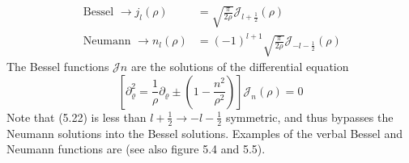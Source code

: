 \begin{align}
\text { Bessel } \rightarrow j_{l}(\rho)&=\sqrt{\frac{\pi}{2 \rho}} \mathcal{J}_{l+\frac{1}{2}}(\rho) \\
 \text { Neumann } \rightarrow n_{l}(\rho)&=(-1)^{l+1} \sqrt{\frac{\pi}{2 \rho}} \mathcal{J}_{-l-\frac{1}{2}}(\rho)
\end{align}
The Bessel functions $\mathcal{J}n$ are the solutions of the differential equation
\begin{equation}
    \left[\partial_{\varrho}^{2}=\frac{1}{\rho} \partial_{\varrho} \pm\left(1-\frac{n^{2}}{\rho^{2}}\right)\right] \mathcal{J}_{n}(\rho)=0
    \end{equation}
Note that (5.22) is less than $l+\frac{1}{2}\rightarrow -l-\frac{1}{2}$ symmetric, and thus bypasses the Neumann solutions into the Bessel solutions. Examples of the verbal Bessel and Neumann functions are (see also figure 5.4 and 5.5).

